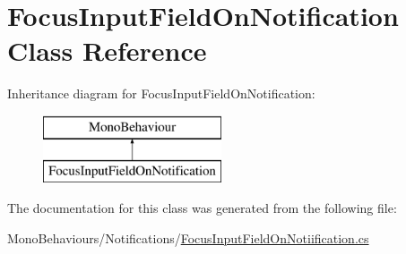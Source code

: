 \hypertarget{class_focus_input_field_on_notification}{}\section{Focus\+Input\+Field\+On\+Notification Class Reference}
\label{class_focus_input_field_on_notification}
Inheritance diagram for Focus\+Input\+Field\+On\+Notification\+:\begin{figure}[H]
\begin{center}
\leavevmode
\includegraphics[height=2.000000cm]{class_focus_input_field_on_notification}
\end{center}
\end{figure}


The documentation for this class was generated from the following file\+:\begin{DoxyCompactItemize}
\item 
Mono\+Behaviours/\+Notifications/\hyperlink{_focus_input_field_on_notiification_8cs}{Focus\+Input\+Field\+On\+Notiification.\+cs}\end{DoxyCompactItemize}
